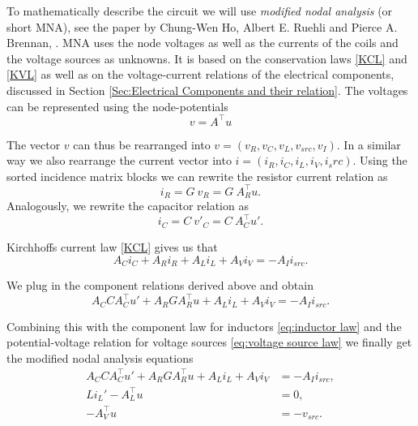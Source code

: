 To mathematically describe the circuit we will use \emph{modified nodal analysis} (or short MNA), see the paper by Chung-Wen Ho, Albert E. Ruehli and Pierce A. Brennan, \cite{MNA75}. MNA uses the node voltages as well as the currents of the coils and the voltage sources as unknowns. It is based on the conservation laws \eqref{KCL} and \eqref{KVL} as well as on the voltage-current relations of the electrical components, discussed in Section \ref{Sec:Electrical Components and their relation}. The voltages can be represented using the node-potentials
\begin{displaymath}
	v = A^\top u
\end{displaymath}

The vector $v$ can thus be rearranged into $v = (v_R, v_C, v_L, v_{src}, v_I)$. In a similar way we also rearrange the current vector into $i = (i_R, i_C, i_L, i_V, i_src)$. Using the sorted incidence matrix blocks we can rewrite the resistor current relation as
	\begin{displaymath}
		i_R = G \ v_R = G \ A_R^\top u.
	\end{displaymath}
Analogously, we rewrite the capacitor relation as
	\begin{displaymath}
		i_C = C \ v'_C = C \ A_C^\top u'.
	\end{displaymath}

Kirchhoffs current law \eqref{KCL} gives us that
\begin{displaymath}
	A_C i_C + A_R i_R + A_L i_L + A_V i_V = -A_I i_{src}.
\end{displaymath}

We plug in the component relations derived above and obtain
\begin{displaymath}
	A_C C A_C^\top u' + A_R G A_R^\top u + A_L i_L + A_V i_V = -A_I i_{src}.
 \end{displaymath}

Combining this with the component law for inductors \eqref{eq:inductor law} and the potential-voltage relation for voltage sources \eqref{eq:voltage source law} we finally get the modified nodal analysis equations
\begin{displaymath}
	\begin{aligned}
		A_C C A_C^\top u' + A_R G A_R^\top u + A_L i_L + A_V i_V &= - A_I i_{src} , \\
		L i_L'	- A_L^\top u &= 0 , \\
		-A_V^\top u &=  -v_{src}.
	\end{aligned}	
\end{displaymath}

